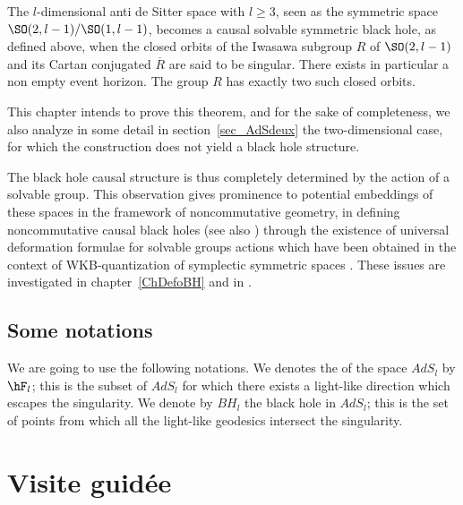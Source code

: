 \begin{theorem}
	The $l$-dimensional anti de Sitter space with $l\geq 3$, seen as the symmetric space $\SO(2,l-1)/\SO(1,l-1)$, becomes a causal solvable symmetric black hole, as defined above, when the closed orbits of the Iwasawa subgroup $R$ of $\SO(2,l-1)$ and its Cartan conjugated $\overline{ R }$ are said to be singular. There exists in particular a non empty event horizon. The group $R$ has exactly two such closed orbits.
	\label{ThoLeBut}
\end{theorem}

This chapter intends to prove this theorem, and for the sake of completeness, we also analyze in some detail in section~\ref{sec_AdSdeux} the two-dimensional case, for which the construction does not yield a black hole structure.

The black hole causal structure is thus completely determined by the action of a solvable group.  This observation gives prominence to potential embeddings of these spaces in the framework of noncommutative geometry, in defining noncommutative causal black holes (see also \cite{BDRS}) through the existence of universal deformation formulae for solvable groups actions which have been obtained in the context of WKB-quantization of symplectic symmetric spaces \cite{StrictSolvableSym,Biel-Massar-2}. These issues are investigated in chapter~\ref{ChDefoBH} and in \cite{articleBVCS}.


\subsection{Some notations}

We are going to use the following notations. We denotes the  of the space $AdS_l$ by $\hF_l$; this is the subset of $AdS_l$ for which there exists a light-like direction which escapes the singularity. We denote by $BH_l$ the black hole in $AdS_l$; this is the set of points from which all the light-like geodesics intersect the singularity.



\section{Visite guidée}

